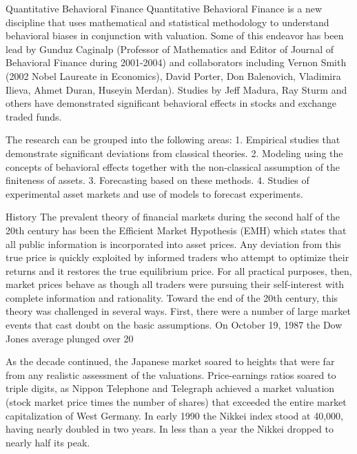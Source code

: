 Quantitative Behavioral Finance
Quantitative Behavioral Finance is a new discipline that uses mathematical and statistical methodology to understand behavioral biases in conjunction with valuation. Some of this endeavor has been lead by Gunduz Caginalp (Professor of Mathematics and Editor of Journal of Behavioral Finance during 2001-2004) and collaborators including Vernon Smith (2002 Nobel Laureate in Economics), David Porter, Don Balenovich, Vladimira Ilieva, Ahmet Duran, Huseyin Merdan). Studies by Jeff Madura, Ray Sturm and others have demonstrated significant behavioral effects in stocks and exchange traded funds.
 
The research can be grouped into the following areas:
1. Empirical studies that demonstrate significant deviations from classical theories.
2. Modeling using the concepts of behavioral effects together with the non-classical assumption of the finiteness of assets.
3. Forecasting based on these methods.
4. Studies of experimental asset markets and use of models to forecast experiments.

History
The prevalent theory of financial markets during the second half of the 20th century has been the Efficient Market Hypothesis (EMH) which states that all public information is incorporated into asset prices. Any deviation from this true price is quickly exploited by informed traders who attempt to optimize their returns and it restores the true equilibrium price. For all practical purposes, then, market prices behave as though all traders were pursuing their self-interest with complete information and rationality.
Toward the end of the 20th century, this theory was challenged in several ways. First, there were a number of large market events that cast doubt on the basic assumptions. On October 19, 1987 the Dow Jones average plunged over 20%
 
As the decade continued, the Japanese market soared to heights that were far from any realistic assessment of the valuations. Price-earnings ratios soared to triple digits, as Nippon Telephone and Telegraph achieved a market valuation (stock market price times the number of shares) that exceeded the entire market capitalization of West Germany. In early 1990 the Nikkei index stood at 40,000, having nearly doubled in two years. In less than a year the Nikkei dropped to nearly half its peak.
 
